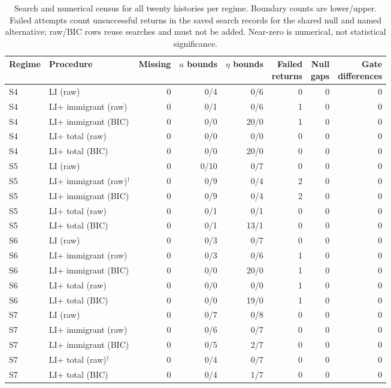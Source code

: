 \begin{table}[htbp]
\centering\small
\setlength{\tabcolsep}{2.5pt}
\caption{Search and numerical census for all twenty histories per regime. Boundary counts are lower/upper. Failed attempts count unsuccessful returns in the saved search records for the shared null and named alternative; raw/BIC rows reuse searches and must not be added. Near-zero is numerical, not statistical significance.}
\label{tab:s04b-joint-disposition-diagnostics}
\begin{tabular}{@{}llrrrrrr@{}}
\toprule
Regime & Procedure & Missing & \shortstack{$a$\\bounds} & \shortstack{$\eta$\\bounds} & \shortstack{Failed\\returns} & \shortstack{Null\\gaps} & \shortstack{Gate\\differences} \\
\midrule
S4 & LI (raw) & 0 & 0/4 & 0/6 & 0 & 0 & 0 \\
S4 & LI+ immigrant (raw) & 0 & 0/1 & 0/6 & 1 & 0 & 0 \\
S4 & LI+ immigrant (BIC) & 0 & 0/0 & 20/0 & 1 & 0 & 0 \\
S4 & LI+ total (raw) & 0 & 0/0 & 0/0 & 0 & 0 & 0 \\
S4 & LI+ total (BIC) & 0 & 0/0 & 20/0 & 0 & 0 & 0 \\
S5 & LI (raw) & 0 & 0/10 & 0/7 & 0 & 0 & 0 \\
S5 & LI+ immigrant (raw)$^{\dagger}$ & 0 & 0/9 & 0/4 & 2 & 0 & 0 \\
S5 & LI+ immigrant (BIC) & 0 & 0/9 & 0/4 & 2 & 0 & 0 \\
S5 & LI+ total (raw) & 0 & 0/1 & 0/1 & 0 & 0 & 0 \\
S5 & LI+ total (BIC) & 0 & 0/1 & 13/1 & 0 & 0 & 0 \\
S6 & LI (raw) & 0 & 0/3 & 0/7 & 0 & 0 & 0 \\
S6 & LI+ immigrant (raw) & 0 & 0/3 & 0/6 & 1 & 0 & 0 \\
S6 & LI+ immigrant (BIC) & 0 & 0/0 & 20/0 & 1 & 0 & 0 \\
S6 & LI+ total (raw) & 0 & 0/0 & 0/0 & 1 & 0 & 0 \\
S6 & LI+ total (BIC) & 0 & 0/0 & 19/0 & 1 & 0 & 0 \\
S7 & LI (raw) & 0 & 0/7 & 0/8 & 0 & 0 & 0 \\
S7 & LI+ immigrant (raw) & 0 & 0/6 & 0/7 & 0 & 0 & 0 \\
S7 & LI+ immigrant (BIC) & 0 & 0/5 & 2/7 & 0 & 0 & 0 \\
S7 & LI+ total (raw)$^{\dagger}$ & 0 & 0/4 & 0/7 & 0 & 0 & 0 \\
S7 & LI+ total (BIC) & 0 & 0/4 & 1/7 & 0 & 0 & 0 \\
\bottomrule
\end{tabular}
\end{table}

